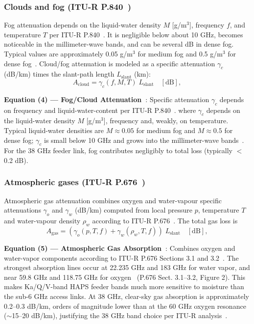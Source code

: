 \documentclass[conference]{IEEEtran}
\begin{document}
\subsubsection{Clouds and fog (ITU-R P.840~\cite{itu_p840})}
Fog attenuation depends on the liquid-water density $M$ [g/m$^3$], frequency
$f$, and temperature $T$ per ITU-R P.840~\cite{itu_p840}. It is negligible below about 10 GHz, becomes noticeable
in the millimeter-wave bands, and can be several dB in dense fog.
Typical values are approximately 0.05 g/m$^3$ for medium fog and 0.5 g/m$^3$ for
dense fog~\cite{itu_p840}.
Cloud/fog attenuation is modeled as a specific attenuation $\gamma_c$ (dB/km)
times the slant-path length $L_\mathrm{slant}$ (km):
\begin{equation}
A_\mathrm{cloud} = \gamma_c(f,M,T) \;L_\mathrm{slant} \quad [\mathrm{dB}],
\label{eq:fog_loss}
\end{equation}

\noindent\textbf{Equation (4) --- Fog/Cloud Attenuation~\cite{itu_p840}}: Specific attenuation $\gamma_c$ depends on frequency and liquid-water-content per ITU-R P.840~\cite{itu_p840}.
where $\gamma_c$ depends on the liquid-water density $M$ [g/m$^3$], frequency
and, weakly, on temperature. Typical liquid-water densities are $M\approx0.05$ for
medium fog and $M\approx0.5$ for dense fog; $\gamma_c$ is small below 10 GHz and
grows into the millimeter-wave bands~\cite{itu_p840}. For the 38 GHz feeder link,
fog contributes negligibly to total loss (typically $<$0.2 dB).

\subsubsection{Atmospheric gases (ITU-R P.676~\cite{itu_p676})}
Atmospheric gas attenuation combines oxygen and water-vapour specific
attenuations $\gamma_o$ and $\gamma_w$ (dB/km) computed from 
local pressure $p$, temperature $T$ and water-vapour density $\rho_w$ according to ITU-R P.676~\cite{itu_p676}.
The total gas loss is
\begin{equation}
A_\mathrm{gas} = (\gamma_o(p,T,f) + \gamma_w(\rho_w,T,f))\;L_\mathrm{slant} \quad [\mathrm{dB}],
\label{eq:gas_loss}
\end{equation}

\noindent\textbf{Equation (5) --- Atmospheric Gas Absorption~\cite{itu_p676}}: Combines oxygen and water-vapor components according to ITU-R P.676 Sections 3.1 and 3.2~\cite{itu_p676}. The strongest absorption lines occur at 22.235 GHz and 183 GHz for water
vapor, and near 59.8 GHz and 118.75 GHz for oxygen~\cite{itu_p676} (P.676 Sect. 3.1--3.2, Figure 2).
This makes Ka/Q/V-band HAPS feeder bands much more sensitive to moisture than the sub-6 GHz access links.
At 38 GHz, clear-sky gas absorption is approximately 0.2--0.3 dB/km, orders of magnitude lower than
at the 60 GHz oxygen resonance ($\sim$15--20 dB/km), justifying the 38 GHz band choice per ITU-R analysis~\cite{itu_p676}.
\end{document}

